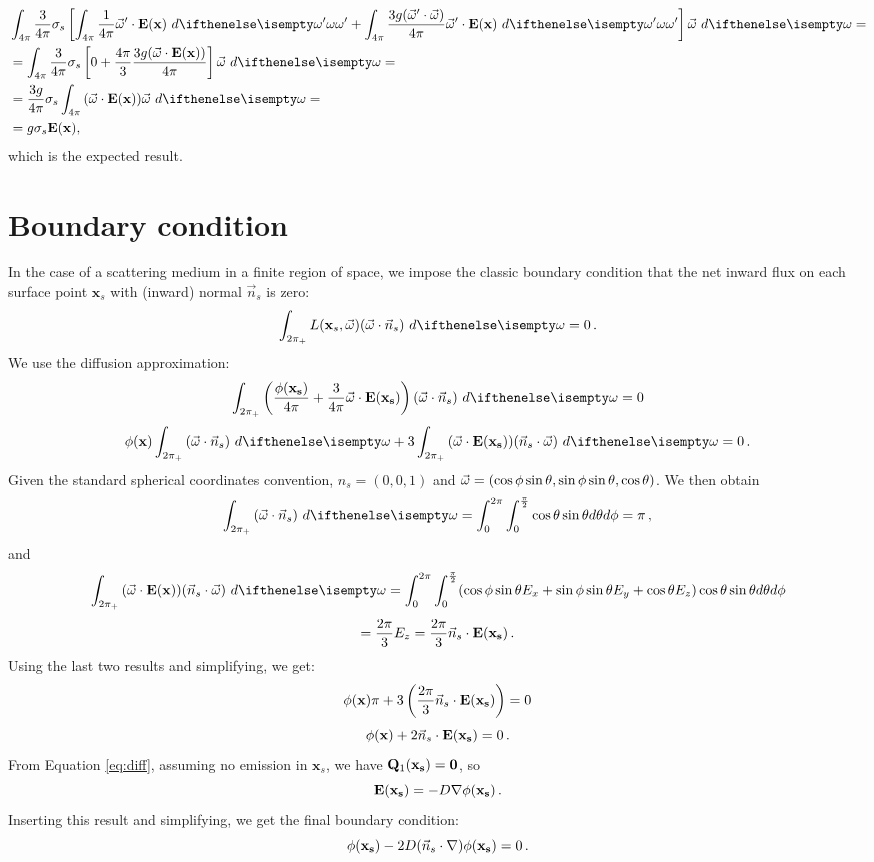 \documentclass[10pt,a4paper]{article}
\begin{document}
\begin{equation*}
\begin{split}
&\sphere{ \frac{3}{4\pi} \scattering  \left[ \sphere { \frac{1}{4\pi}  \omegavec' \cdot \xvecfunc{E}}{\omega'} + \sphere { \frac{3g (\omegavec' \cdot \omegavec)}{4\pi}  \omegavec' \cdot \xvecfunc{E}}{\omega'} \right] \omegavec}{}  =  \\
&= \sphere{ \frac{3}{4\pi} \scattering  \left[ 0 + \frac{4 \pi}{3} \frac{3g (\omegavec \cdot  \xvecfunc{E})}{4\pi}  \right] \omegavec}{}  = \\
&=  \frac{3 g}{4\pi} \scattering \sphere{  (\omegavec \cdot \xvecfunc{E}) \omegavec}{}  = \\
&= g \scattering  \xvecfunc{E},
\end{split}
\end{equation*}
which is the expected result.
\section{Boundary condition}

In the case of a scattering medium in a finite region of space, we impose the classic boundary condition that the net inward flux on each surface point $\mathbf{x}_s$ with (inward) normal $\vec{n}_s$ is zero:
$$
\hemisphere{L(\mathbf{x}_s, \omegavec) (\omegavec \cdot \vec{n}_s)}{} = 0 \, .
$$
We use the diffusion approximation:
$$
\hemisphere{\left(\frac{\func{\phi}{\mathbf{x}_s}}{4\pi} + \frac{3}{4\pi} \omegavec \cdot \vecfunc{E}{\mathbf{x}_s}\right) (\omegavec \cdot \vec{n}_s)}{} = 0
$$
$$
\xfunc{\phi} \hemisphere{ (\omegavec \cdot \vec{n}_s)}{} + 3  \hemisphere{(\omegavec \cdot \vecfunc{E}{\mathbf{x}_s}) (\vec{n}_s \cdot \omegavec) }{} = 0 \, .
$$
Given the standard spherical coordinates convention, $n_s = (0,0,1)$ and $\vec{\omega} = (\cos\phi\sin\theta,\sin\phi\sin\theta,\cos\theta)$. We then obtain
$$
\hemisphere{ (\omegavec \cdot \vec{n}_s)}{} = \int_{0}^{2\pi} \int_{0}^{\frac{\pi}{2}} \cos\theta \sin\theta d\theta d\phi = \pi \, ,
$$
and
$$
\hemisphere{(\omegavec \cdot \xvecfunc{E}) (\vec{n}_s \cdot \omegavec) }{} = \int_{0}^{2\pi} \int_{0}^{\frac{\pi}{2}}(\cos\phi\sin\theta E_x+\sin\phi\sin\theta E_y+\cos\theta E_z) \cos\theta \sin\theta d\theta d\phi
$$
$$
= \frac{2\pi}{3} E_z = \frac{2\pi}{3} \vec{n}_s \cdot \mathbf{E}(\mathbf{\mathbf{x}_s}) \, .
$$
Using the last two results and simplifying, we get:
$$
{\phi}(\mathbf{x}) \pi + 3 \left(\frac{2\pi}{3} \vec{n}_s \cdot \mathbf{E}(\mathbf{\mathbf{x}_s})\right)= 0
$$
$$
{\phi}(\mathbf{x}) + 2 \vec{n}_s \cdot \mathbf{E}(\mathbf{\mathbf{x}_s}) = 0 \, .
$$
From Equation \ref{eq:diff}, assuming no emission in $\mathbf{x}_s$, we have $\mathbf{Q}_1(\mathbf{\mathbf{x}_s}) = \mathbf{0}$, so
$$
\mathbf{E}(\mathbf{\mathbf{x}_s}) = - D{\nabla} {\phi}(\mathbf{\mathbf{x}_s}) \, .
$$
Inserting this result and simplifying, we get the final boundary condition:
$$
{\phi}(\mathbf{\mathbf{x}_s}) - 2 D (\vec{n}_s \cdot {\nabla}) {\phi}(\mathbf{\mathbf{x}_s}) = 0 \, .
$$
\end{document}
